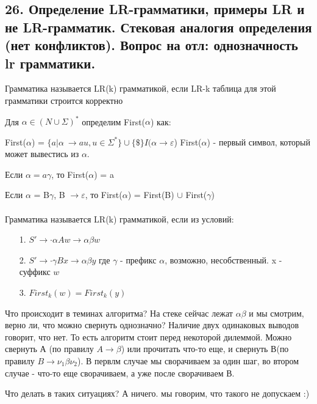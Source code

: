 \subsection{26. Определение LR-грамматики, примеры LR и не LR-грамматик. Стековая аналогия определения (нет конфликтов).  Вопрос на отл: однозначность lr грамматики.}

\Def Грамматика называется LR(k) грамматикой, если LR-k таблица для этой грамматики строится корректно

\Def Для $\alpha \in (N \cup \Sigma)^*$ определим First($\alpha$) как:

First($\alpha$) = $\{a | \alpha\ \rightarrow  au, u \in \Sigma^*\} \cup \{\$\}I(\alpha \rightarrow \varepsilon$)
First($\alpha$) - первый символ, который может вывестись из $\alpha$.

Если $\alpha = a\gamma$, то First($\alpha$) = a

Если $\alpha$ = B$\gamma$, B $\rightarrow \varepsilon$, то First($\alpha$) = First(B) $\cup$ First($\gamma$)
\\
\\
\Def Грамматика называется LR(k) грамматикой, если из условий:
\begin{itemize}
    \item [1.] $S' \rightarrow \cdot \alpha A w \rightarrow \alpha \beta w$
    \item [2.] $S' \rightarrow \cdot \gamma B x \rightarrow \alpha \beta y $ где $\gamma$ - префикс $\alpha$, возможно, несобственный. x - суффикс $w$
    \item [3.] $First_k(w) = First_k(y)$
\end{itemize}
Что происходит в теминах алгоритма? На стеке сейчас лежат $\alpha \beta$ и мы смотрим, верно ли, что можно свернуть однозначно? Наличие двух одинаковых выводов говорит, что нет. То есть алгоритм стоит перед некоторой дилеммой. Можно свернуть А (по правилу $A \rightarrow \beta$) или прочитать что-то еще, и свернуть В(по правилу $B \rightarrow \nu_1 \beta \nu_2$). В первлм случае мы сворачиваем за один шаг, во втором случае - что-то еще сворачиваем, а уже после сворачиваем В.


Что делать в таких ситуациях? А ничего. мы говорим, что такого не допускаем :)


